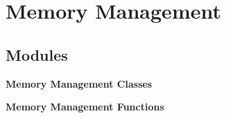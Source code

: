 \section{Memory Management}
\label{group__memory__management}
\subsection*{Modules}
\begin{CompactItemize}
\item 
{\bf Memory Management Classes}
\item 
{\bf Memory Management Functions}
\end{CompactItemize}
